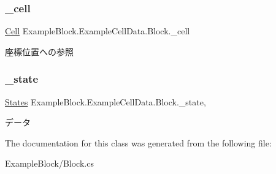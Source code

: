 \subsubsection{\texorpdfstring{\+\_\+cell}{\_cell}}
{\footnotesize\ttfamily \mbox{\hyperlink{class_hexagonal_map_1_1_domain_1_1_hex_map_1_1_cell}{Cell}} Example\+Block.\+Example\+Cell\+Data.\+Block.\+\_\+cell\hspace{0.3cm}{\ttfamily [get]}}



座標位置への参照 

\mbox{\label{class_example_block_1_1_example_cell_data_1_1_block_a6818333cb2347c286e82ecfa3ea1e8b2}} 
\subsubsection{\texorpdfstring{\+\_\+state}{\_state}}
{\footnotesize\ttfamily \mbox{\hyperlink{namespace_example_block_1_1_example_cell_data_a6921c403602d917464ccf88b5ac8b2bc}{States}} Example\+Block.\+Example\+Cell\+Data.\+Block.\+\_\+state\hspace{0.3cm}{\ttfamily [get]}, {\ttfamily [set]}}



データ 



The documentation for this class was generated from the following file\+:\begin{DoxyCompactItemize}
\item 
Example\+Block/Block.\+cs\end{DoxyCompactItemize}

